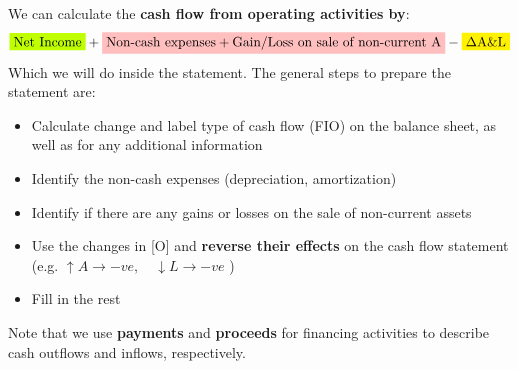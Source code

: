 We can calculate the \textbf{cash flow from operating activities by}:
\[ \mathcolorbox{lime}{\text{Net Income}} + \mathcolorbox{pink}{\text{Non-cash expenses} + \text{Gain/Loss on sale of non-current A}} - \mathcolorbox{yellow}{\Delta\text{A\&L}} \]
Which we will do inside the statement. The general steps to prepare the statement are:
\begin{itemize}
    \item Calculate change and label type of cash flow (FIO) on the balance sheet, as well as for any additional information
    \item Identify the non-cash expenses (depreciation, amortization)
    \item Identify if there are any gains or losses on the sale of non-current assets
    \item Use the changes in [O] and \textbf{reverse their effects} on the cash flow statement\\
          (e.g. $\uparrow A \rightarrow -ve,\quad\downarrow L \rightarrow -ve$ )
    \item Fill in the rest
\end{itemize}

Note that we use \textbf{payments} and \textbf{proceeds} for financing activities to describe cash outflows and inflows, respectively.

\small

